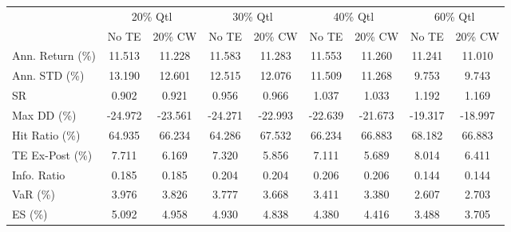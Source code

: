 \begin{tabular}{lcccccccc}
\toprule
{} & \multicolumn{2}{c}{20\% Qtl} & \multicolumn{2}{c}{30\% Qtl} & \multicolumn{2}{c}{40\% Qtl} & \multicolumn{2}{c}{60\% Qtl} \\
{} &   No TE &  20\% CW &   No TE &  20\% CW &   No TE &  20\% CW &   No TE &  20\% CW \\
\midrule
Ann. Return (\%) &  11.513 &  11.228 &  11.583 &  11.283 &  11.553 &  11.260 &  11.241 &  11.010 \\
Ann. STD (\%)    &  13.190 &  12.601 &  12.515 &  12.076 &  11.509 &  11.268 &   9.753 &   9.743 \\
SR              &   0.902 &   0.921 &   0.956 &   0.966 &   1.037 &   1.033 &   1.192 &   1.169 \\
Max DD (\%)      & -24.972 & -23.561 & -24.271 & -22.993 & -22.639 & -21.673 & -19.317 & -18.997 \\
Hit Ratio (\%)   &  64.935 &  66.234 &  64.286 &  67.532 &  66.234 &  66.883 &  68.182 &  66.883 \\
TE Ex-Post (\%)  &   7.711 &   6.169 &   7.320 &   5.856 &   7.111 &   5.689 &   8.014 &   6.411 \\
Info. Ratio     &   0.185 &   0.185 &   0.204 &   0.204 &   0.206 &   0.206 &   0.144 &   0.144 \\
VaR (\%)         &   3.976 &   3.826 &   3.777 &   3.668 &   3.411 &   3.380 &   2.607 &   2.703 \\
ES (\%)          &   5.092 &   4.958 &   4.930 &   4.838 &   4.380 &   4.416 &   3.488 &   3.705 \\
\bottomrule
\end{tabular}
